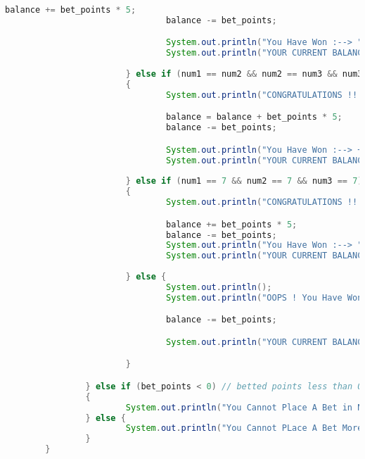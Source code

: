 \documentclass[]{article}
\begin{document}
\begin{lstlisting}[language=Java]
                                balance += bet_points * 5;
                                balance -= bet_points;

                                System.out.println("You Have Won :--> " + bet_points * 5);
                                System.out.println("YOUR CURRENT BALANCE --> " + balance);
                                
                        } else if (num1 == num2 && num2 == num3 && num3 == num1) // all numbers are equal
                        {
                                System.out.println("CONGRATULATIONS !!!!");

                                balance = balance + bet_points * 5;
                                balance -= bet_points;

                                System.out.println("You Have Won :--> +" + bet_points * 5);
                                System.out.println("YOUR CURRENT BALANCE --> " + balance);
                                
                        } else if (num1 == 7 && num2 == 7 && num3 == 7) // all are equal to 7
                        {
                                System.out.println("CONGRATULATIONS !!!!");

                                balance += bet_points * 5;
                                balance -= bet_points;
                                System.out.println("You Have Won :--> " + bet_points * 5);
                                System.out.println("YOUR CURRENT BALANCE --> " + balance);
                                
                        } else {
                                System.out.println();
                                System.out.println("OOPS ! You Have Won Nothing !!");

                                balance -= bet_points;

                                System.out.println("YOUR CURRENT BALANCE --> " + balance);

                        }

                } else if (bet_points < 0) // betted points less than 0      
                {
                        System.out.println("You Cannot Place A Bet in Negative");
                } else {
                        System.out.println("You Cannot PLace A Bet More Than Your Current Balance ");
                }
        }




\end{lstlisting}
\end{document}
